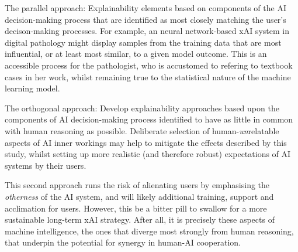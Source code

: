 The parallel approach: Explainability elements based on components of the AI decision-making process that are identified as most closely matching the user's decison-making processes. For example, an neural network-based xAI system in digital pathology might display samples from the training data that are most influential, or at least most similar, to a given model outcome. This is an accessible process for the pathologist, who is accustomed to refering to textbook cases in her work, whilst remaining true to the statistical nature of the machine learning model.

The orthogonal approach: Develop explainability approaches based upon the components of AI decision-making process identified to have as little in common with human reasoning as possible. Deliberate selection of human-\textit{un}relatable aspects of AI inner workings may help to mitigate the effects described by this study, whilst setting up more realistic (and therefore robust) expectations of AI systems by their users. 

This second approach runs the risk of alienating users by emphasising the \textit{otherness} of the AI system, and will likely additional training, support and acclimation for users. However, this be a bitter pill to swallow for a more sustainable long-term xAI strategy. After all, it is precisely these aspects of machine intelligence, the ones that diverge most strongly from human reasoning, that underpin the potential for synergy in human-AI cooperation.